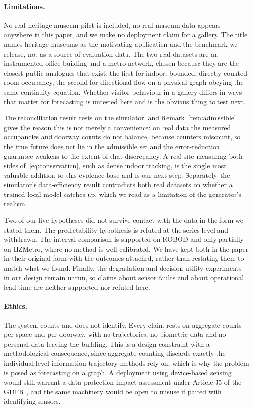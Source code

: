 \documentclass[11pt]{article}
\theoremstyle{plain}
\theoremstyle{definition}
\theoremstyle{remark}
\begin{document}
\paragraph{Limitations.}
No real heritage museum pilot is included, no real museum data appears anywhere in this paper, and we make no deployment claim for a gallery. The title names heritage museums as the motivating application and the benchmark we release, not as a source of evaluation data. The two real datasets are an instrumented office building and a metro network, chosen because they are the closest public analogues that exist: the first for indoor, bounded, directly counted room occupancy, the second for directional flow on a physical graph obeying the same continuity equation. Whether visitor behaviour in a gallery differs in ways that matter for forecasting is untested here and is the obvious thing to test next.

The reconciliation result rests on the simulator, and Remark~\ref{rem:admissible} gives the reason this is not merely a convenience: on real data the measured occupancies and doorway counts do not balance, because counters miscount, so the true future does not lie in the admissible set and the error-reduction guarantee weakens to the extent of that discrepancy. A real site measuring both sides of~\eqref{eq:conservation}, such as dense indoor tracking, is the single most valuable addition to this evidence base and is our next step. Separately, the simulator's data-efficiency result contradicts both real datasets on whether a trained local model catches up, which we read as a limitation of the generator's realism.

Two of our five hypotheses did not survive contact with the data in the form we stated them. The predictability hypothesis is refuted at the series level and withdrawn. The interval comparison is supported on ROBOD and only partially on HZMetro, where no method is well calibrated. We have kept both in the paper in their original form with the outcomes attached, rather than restating them to match what we found. Finally, the degradation and decision-utility experiments in our design remain unrun, so claims about sensor faults and about operational lead time are neither supported nor refuted here.

\paragraph{Ethics.}
The system counts and does not identify. Every claim rests on aggregate counts per space and per doorway, with no trajectories, no biometric data and no personal data leaving the building. This is a design constraint with a methodological consequence, since aggregate counting discards exactly the individual-level information trajectory methods rely on, which is why the problem is posed as forecasting on a graph. A deployment using device-based sensing would still warrant a data protection impact assessment under Article 35 of the GDPR \citep{gdpr}, and the same machinery would be open to misuse if paired with identifying sensors.
\end{document}
